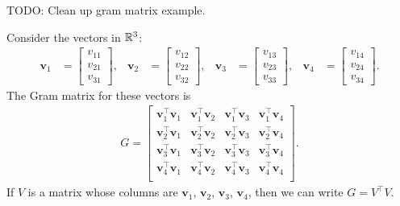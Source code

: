TODO: Clean up gram matrix example.

\def\v{\mathbf{v}}
% 
Consider the vectors in \(\mathbb{R}^3\):
\begin{align*}
    \v_1 &=
    \begin{bmatrix}
        v_{11} \\ v_{21} \\ v_{31}
    \end{bmatrix},&
    \v_2 &=
    \begin{bmatrix}
        v_{12} \\ v_{22} \\ v_{32}
    \end{bmatrix},&
    \v_3 &=
    \begin{bmatrix}
        v_{13} \\ v_{23} \\ v_{33}
    \end{bmatrix},&
    \v_4 &=
    \begin{bmatrix}
        v_{14} \\ v_{24} \\ v_{34}
    \end{bmatrix}.
\end{align*}
The Gram matrix for these vectors is
\begin{align*}
    G = \begin{bmatrix}
        \v_1^\top \v_1 & \v_1^\top \v_2 & \v_1^\top \v_3 & \v_1^\top \v_4\\[3pt]
        \v_2^\top \v_1 & \v_2^\top \v_2 & \v_2^\top \v_3 & \v_2^\top \v_4\\[3pt]
        \v_3^\top \v_1 & \v_3^\top \v_2 & \v_3^\top \v_3 & \v_3^\top \v_4\\[3pt]
        \v_4^\top \v_1 & \v_4^\top \v_2 & \v_4^\top \v_3 & \v_4^\top \v_4\\
    \end{bmatrix}.
\end{align*}
If \(V\) is a matrix whose columns are \(\v_1\), \(\v_2\), \(\v_3\), \(\v_4\), then we can write \(G = V^\top V\).
